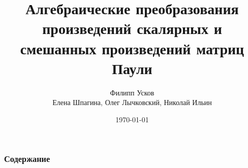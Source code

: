 \documentclass{beamer}
\title[Алгебраические преобразования $\sigma$-матриц]{Алгебраические   преобразования   произведений   скалярных   и   смешанных   произведений
матриц Паули} %
\author[Филипп Усков]{Филипп Усков\\[2mm]Елена Шпагина, Олег Лычковский, Николай Ильин} %
\institute[Сколтех] %
{
Сколтех; МГУ им. Ломоносова \\ %
\medskip
\textit{fel1992@mail.ru} %
}
\date{\today} %
\begin{document}
\begin{frame}
\titlepage %
\end{frame}

\begin{frame}
\frametitle{Содержание} %
\tableofcontents %
\end{frame}



\newcommand{\ssigma}{{\boldsymbol{\sigma}}}
\newcommand{\cc}{{\boldsymbol{\sigma}}}
\newcommand{\tr}{\mathrm{tr}}

\end{document}
